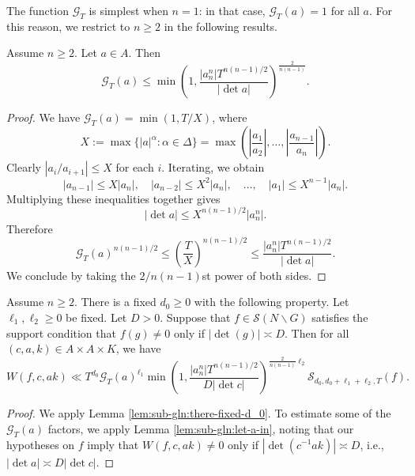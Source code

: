 The function $\mathcal{G}_T$ is simplest when $n=1$: in that case, $\mathcal{G}_T(a) = 1$ for all $a$.  For this reason, we restrict to $n \geq 2$ in the following results.
\begin{lemma}\label{lem:sub-gln:let-a-in}
  Assume $n \geq 2$.  Let $a \in A$.  Then
  \begin{equation*}
    \mathcal{G}_T(a) \leq
    \min \left( 1,
      \frac{|a_n^n| T^{n(n-1)/2}}{ |\det a|}
    \right)^{ \frac{2}{n(n-1)} }.
  \end{equation*}
\end{lemma}
\begin{proof}
  We have $\mathcal{G}_T(a) = \min(1,T/X)$, where
  \begin{equation*}
    X := \max \{|a|^\alpha : \alpha \in \Delta \}
    = \max \left( \left\lvert \frac{a_1}{a_2} \right\rvert, \dotsc, \left\lvert \frac{a_{n-1}}{a_{n}} \right\rvert \right).
  \end{equation*}
  Clearly $|a_i / a_{i+1}| \leq X$ for each $i$.  Iterating, we obtain
  \begin{equation*}
    |a_{n-1}| \leq X |a_n|,
    \quad
    |a_{n-2}| \leq X^2 |a_{n}|,
    \quad
    \dotsc,
    \quad
    |a_1| \leq X^{n-1} |a_n|.
  \end{equation*}
  Multiplying these inequalities together gives
  \begin{equation*}
    |\det a| \leq X^{n(n-1)/2} |a_n^n|.
  \end{equation*}
  Therefore
  \begin{equation*}
    \mathcal{G}_T(a)^{n(n-1)/2}
    \leq \left( \frac{T}{X} \right)^{n(n-1)/2}
    \leq
    \frac{|a_n^n| T^{n(n-1)/2} }{|\det a|}.
  \end{equation*}
  We conclude by taking the $2/n(n-1)$st power of both sides.
\end{proof}

\begin{lemma}\label{lem:sub-gln:there-fixed-d_0-1}
  Assume $n \geq 2$.  There is a fixed $d_0 \geq 0$ with the following property.  Let $\ell_1, \ell_2 \geq 0$ be fixed.  Let $D > 0$.  Suppose that $f \in \mathcal{S}(N \backslash G)$ satisfies the support condition that $f(g) \neq 0$ only if $|\det(g)| \asymp D$.  Then for all $(c,a,k) \in A \times A \times K$, we have
  \begin{equation}\label{eq:wf-c-k-3}
    W(f,c,a k) \ll
    T^{d_0}
    \mathcal{G}_T(a)^{\ell_1}
    \min \left( 1,
      \frac{|a_n^n| T^{n(n-1)/2}}{D |\det c|}
    \right)^{\frac{2}{n(n-1)} \ell_2 }
    \mathcal{S}_{d_0, d_0+ \ell_1 + \ell_2, T}(f).
  \end{equation}
\end{lemma}
\begin{proof}
  We apply Lemma \ref{lem:sub-gln:there-fixed-d_0}.  To estimate some of the $\mathcal{G}_T(a)$ factors, we apply Lemma \ref{lem:sub-gln:let-a-in}, noting that our hypotheses on $f$ imply that $W(f,c,a k) \neq 0$ only if $|\det(c^{-1} a k)| \asymp D$, i.e., $|\det a| \asymp D |\det c|$.
\end{proof}



